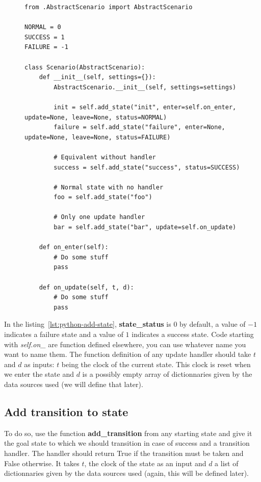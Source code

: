 \documentclass[12pt]{article}
\theoremstyle{definition}
\theoremstyle{definition}
\theoremstyle{remark}
\begin{document}
\begin{figure}[H]
    \begin{lstlisting}[caption="Various usage of self.add\_state",label={lst:python-add-state-examples}]
from .AbstractScenario import AbstractScenario

NORMAL = 0
SUCCESS = 1
FAILURE = -1

class Scenario(AbstractScenario):
    def __init__(self, settings={}):
        AbstractScenario.__init__(self, settings=settings)

        init = self.add_state("init", enter=self.on_enter, update=None, leave=None, status=NORMAL)
        failure = self.add_state("failure", enter=None, update=None, leave=None, status=FAILURE)

        # Equivalent without handler
        success = self.add_state("success", status=SUCCESS)

        # Normal state with no handler
        foo = self.add_state("foo")

        # Only one update handler
        bar = self.add_state("bar", update=self.on_update)

    def on_enter(self):
        # Do some stuff
        pass

    def on_update(self, t, d):
        # Do some stuff
        pass
    \end{lstlisting}
\end{figure}

In the listing~\ref{lst:python-add-state}, \textbf{state\_status} is $0$ by default, a value of $-1$ indicates a failure state and a value of $1$ indicates a success state. Code starting with \textit{self.on\_} are function defined elsewhere, you can use whatever name you want to name them. The function definition of any update handler should take $t$ and $d$ as inputs: $t$ being the clock of the current state. This clock is reset when we enter the state and $d$ is a possibly empty array of dictionnaries given by the data sources used (we will define that later).



\subsection{Add transition to state}

To do so, use the function \textbf{add\_transition} from any starting state and give it the goal state to which we should transition in case of success and a transition handler. The handler should return True if the transition must be taken and False otherwise. It takes $t$, the clock of the state as an input and $d$ a list of dictionnaries given by the data sources used (again, this will be defined later).
\end{document}
